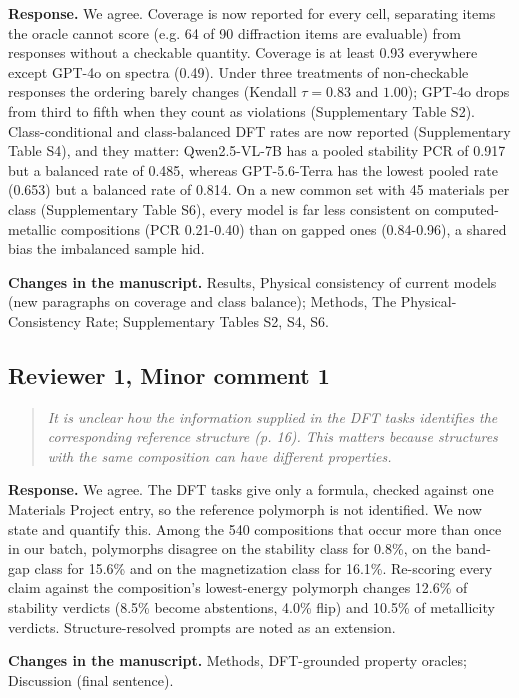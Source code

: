 \documentclass[11pt,a4paper]{article}
\newenvironment{reviewer}{\begin{quote}\itshape\small}{\end{quote}}
\begin{document}
\textbf{Response.} We agree. Coverage is now reported for every cell, separating items the oracle cannot score (e.g. 64 of 90 diffraction items are evaluable) from responses without a checkable quantity. Coverage is at least 0.93 everywhere except GPT-4o on spectra (0.49). Under three treatments of non-checkable responses the ordering barely changes (Kendall $\tau=0.83$ and $1.00$); GPT-4o drops from third to fifth when they count as violations (Supplementary Table S2). Class-conditional and class-balanced DFT rates are now reported (Supplementary Table S4), and they matter: Qwen2.5-VL-7B has a pooled stability PCR of 0.917 but a balanced rate of 0.485, whereas GPT-5.6-Terra has the lowest pooled rate (0.653) but a balanced rate of 0.814. On a new common set with 45 materials per class (Supplementary Table S6), every model is far less consistent on computed-metallic compositions (PCR 0.21-0.40) than on gapped ones (0.84-0.96), a shared bias the imbalanced sample hid.

\textbf{Changes in the manuscript.} Results, Physical consistency of current models (new paragraphs on coverage and class balance); Methods, The Physical-Consistency Rate; Supplementary Tables S2, S4, S6.

\subsection*{Reviewer 1, Minor comment 1}

\begin{reviewer}It is unclear how the information supplied in the DFT tasks identifies the corresponding reference structure (p. 16). This matters because structures with the same composition can have different properties.\end{reviewer}

\textbf{Response.} We agree. The DFT tasks give only a formula, checked against one Materials Project entry, so the reference polymorph is not identified. We now state and quantify this. Among the 540 compositions that occur more than once in our batch, polymorphs disagree on the stability class for 0.8\%, on the band-gap class for 15.6\% and on the magnetization class for 16.1\%. Re-scoring every claim against the composition's lowest-energy polymorph changes 12.6\% of stability verdicts (8.5\% become abstentions, 4.0\% flip) and 10.5\% of metallicity verdicts. Structure-resolved prompts are noted as an extension.

\textbf{Changes in the manuscript.} Methods, DFT-grounded property oracles; Discussion (final sentence).
\end{document}
